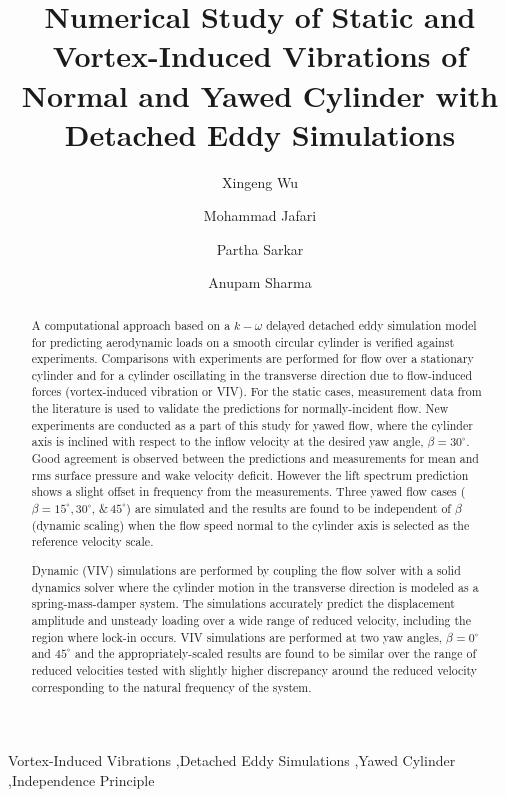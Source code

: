 \documentclass[12pt,authoryear]{elsarticle}
\begin{document}
\begin{frontmatter}

\title{Numerical Study of Static and Vortex-Induced Vibrations of Normal and
Yawed Cylinder with Detached Eddy Simulations}


\author[1]{Xingeng Wu}
\author[1]{Mohammad Jafari} 
\author[2]{Partha Sarkar}
\author[3]{Anupam Sharma}

\address{Department of Aerospace Engineering, Iowa State University, Ames, Iowa, 50011}

\begin{abstract}
A computational approach based on a $k-\omega$ delayed detached eddy simulation
model for predicting aerodynamic loads on a smooth circular cylinder is
verified against experiments. Comparisons with experiments are performed for
flow over a stationary cylinder and for a cylinder oscillating in the
transverse direction due to flow-induced forces (vortex-induced vibration or
VIV). For the static cases, measurement data from the literature is used to
validate the predictions for normally-incident flow. New experiments are
conducted as a part of this study for yawed flow, where the cylinder axis is
inclined with respect to the inflow velocity at the desired yaw angle,
$\beta=30^\circ$. Good agreement is observed between the predictions and
measurements for mean and rms surface pressure and wake velocity deficit.
However the lift spectrum prediction shows a slight offset in frequency from
the measurements. Three yawed flow cases ($\beta=15^\circ, 30^\circ, \,\&\,
45^\circ$) are simulated and the results are found to be independent of $\beta$
(dynamic scaling) when the flow speed normal to the cylinder axis is selected
as the reference velocity scale.  

Dynamic (VIV) simulations are performed by coupling the flow solver with a
solid dynamics solver where the cylinder motion in the transverse direction is
modeled as a spring-mass-damper system. The simulations accurately predict the
displacement amplitude and unsteady loading over a wide range of reduced
velocity, including the region where lock-in occurs. VIV simulations are
performed at two yaw angles, $\beta=0^\circ$ and $45^\circ$ and the
appropriately-scaled results are found to be similar over the range of reduced
velocities tested with slightly higher discrepancy around the reduced velocity
corresponding to the natural frequency of the system.
\end{abstract}

\begin{keyword}
  Vortex-Induced Vibrations \sep Detached Eddy Simulations \sep Yawed Cylinder \sep Independence Principle
\end{keyword}
\end{frontmatter}
\end{document}
